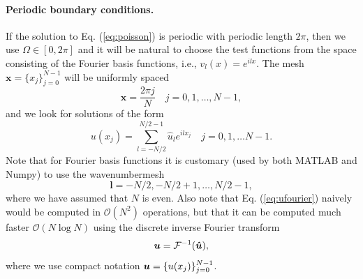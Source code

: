 \documentclass[%
oneside,                 %
final,                   %
10pt]{article}
\theoremstyle{definition}
\begin{document}
\paragraph{Periodic boundary conditions.}
\label{sec:fourierpoisson}
If the solution to Eq. (\ref{eq:poisson}) is periodic with periodic length $2 \pi$, then we use $\Omega \in [0, 2 \pi]$ and it will be natural to choose the test functions from the space consisting of the Fourier basis functions, i.e.,  $v_l(x)=e^{ilx}$. The mesh $\boldsymbol{x} = \{x_j\}_{j=0}^{N-1}$ will be uniformly spaced 
\begin{equation}
\boldsymbol{x} = \frac{2 \pi j}{N}  \quad j=0,1,\ldots, N-1,
\end{equation}
and we look for solutions of the form
\begin{equation}
u(x_j) = \sum_{l=-N/2}^{N/2-1} \hat{u}_l e^{ilx_j} \quad  j=0,1,\ldots N-1.
\label{eq:ufourier}
\end{equation}
Note that for Fourier basis functions it is customary (used by both MATLAB and Numpy) to use the wavenumbermesh
\begin{equation}
\boldsymbol{l} = -N/2, -N/2+1, \ldots, N/2-1, \label{eq:wavenumber_even}
\end{equation}
where we have assumed that $N$ is even. Also note that Eq. (\ref{eq:ufourier}) naively would be computed in $\mathcal{O}(N^2)$ operations, but that it can be computed much faster $\mathcal{O}(N\log N)$ using the discrete inverse Fourier transform
\begin{equation}
\boldsymbol{u} = \mathcal{F}^{-1}(\boldsymbol{\hat{u}}),
\end{equation}
where we use compact notation $\boldsymbol{u} = \{u(x_j)\}_{j=0}^{N-1}$.
\end{document}
